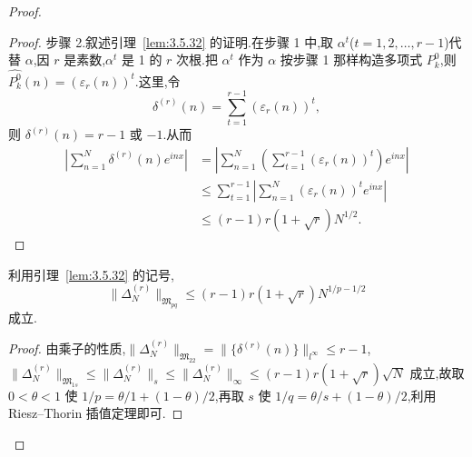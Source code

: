 \begin{proof}
\begin{proof}
步骤 2.叙述引理~\ref{lem:3.5.32} 的证明.在步骤 1 中,取 $\alpha^{t}$($t=1,2,\ldots,r-1$)代替 $\alpha$,因 $r$ 是素数,$\alpha^{t}$ 是 1 的 $r$ 次根.把 $\alpha^{t}$ 作为 $\alpha$ 按步骤 1 那样构造多项式 $P_{k}^{0}$,则 $\widehat{P_{k}^{0}}(n)=(\varepsilon_{r}(n))^{t}$.这里,令
\begin{equation*}
\delta^{(r)}(n) = \sum_{t=1}^{r-1}(\varepsilon_{r}(n))^{t},
\end{equation*}
则 $\delta^{(r)}(n)=r-1$ 或 $-1$.从而
\begin{align*}
\left|\sum_{n=1}^{N}\delta^{(r)}(n)e^{inx}\right| &= \left|\sum_{n=1}^{N}\left(\sum_{t=1}^{r-1}(\varepsilon_{r}(n))^{t}\right)e^{inx}\right|\\
&\leq \sum_{t=1}^{r-1}\left|\sum_{n=1}^{N}(\varepsilon_{r}(n))^{t}e^{inx}\right|\\
&\leq (r-1)r(1+\sqrt{r})N^{1/2}.
\end{align*}
\end{proof}

\begin{lemma}\label{lem:3.5.33}
利用引理~\ref{lem:3.5.32} 的记号,
\begin{equation*}
\|\Delta_{N}^{(r)}\|_{\mathfrak{M}_{pq}} \leq (r-1)r(1+\sqrt{r})N^{1/p - 1/2}
\end{equation*}
成立.
\end{lemma}

\begin{proof}
由乘子的性质,$\|\Delta_{N}^{(r)}\|_{\mathfrak{M}_{22}}=\|\{\delta^{(r)}(n)\}\|_{l^{\infty}}\leq r-1$,$\|\Delta_{N}^{(r)}\|_{\mathfrak{M}_{1s}}\leq\|\Delta_{N}^{(r)}\|_{s}\leq\|\Delta_{N}^{(r)}\|_{\infty}\leq(r-1)r(1+\sqrt{r})\sqrt{N}$ 成立,故取 $0<\theta<1$ 使 $1/p=\theta/1+(1-\theta)/2$,再取 $s$ 使 $1/q=\theta/s+(1-\theta)/2$,利用 Riesz--Thorin 插值定理即可.
\end{proof}


\end{proof}
